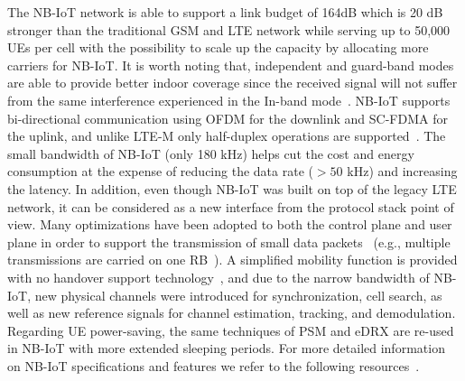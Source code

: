 \documentclass[]{IEEEtran}
\begin{document}
The NB-IoT network is able to support a link budget of 164dB which is 20 dB stronger than the traditional GSM and LTE network\cite{hwang_survey_2019} while serving up to 50,000 UEs per cell with the possibility to scale up the capacity by allocating more carriers for NB-IoT\cite{raza2017low}.
It is worth noting that, independent and guard-band modes are able to provide better indoor coverage since the received signal will not suffer from the same interference experienced in the In-band mode~\cite{poursafar2017long}.
NB-IoT supports bi-directional communication using OFDM for the downlink and SC-FDMA for the uplink, and unlike LTE-M only half-duplex operations are supported~\cite{ding_iot_2020}.
The small bandwidth of NB-IoT (only 180 kHz) helps cut the cost and energy consumption at the expense of reducing the data rate ($> 50$ kHz\cite{rico2016overview}) and increasing the latency.
In addition, even though NB-IoT was built on top of the legacy LTE network, it can be considered as a new interface from the protocol stack point of view\cite{mekki2019comparative}.
Many optimizations have been adopted to both the control plane and user plane in order to support the transmission of small data packets~\cite{sharma2019toward} (e.g., multiple transmissions are carried on one RB~\cite{accurso_exploring_2021}).
A simplified mobility function is provided with no handover support technology~\cite{foubert2020long}, and due to the narrow bandwidth of NB-IoT, new physical channels were introduced for synchronization, cell search, as well as new reference signals for channel estimation, tracking, and demodulation\cite{rico2016overview}.
Regarding UE power-saving, the same techniques of PSM and eDRX are re-used in NB-IoT with more extended sleeping periods\cite{vaezi_cellular_2022_2}.
For more detailed information on NB-IoT specifications and features we refer to the following resources~\cite{wang2017primer,chen2017narrow}. 
\end{document}
